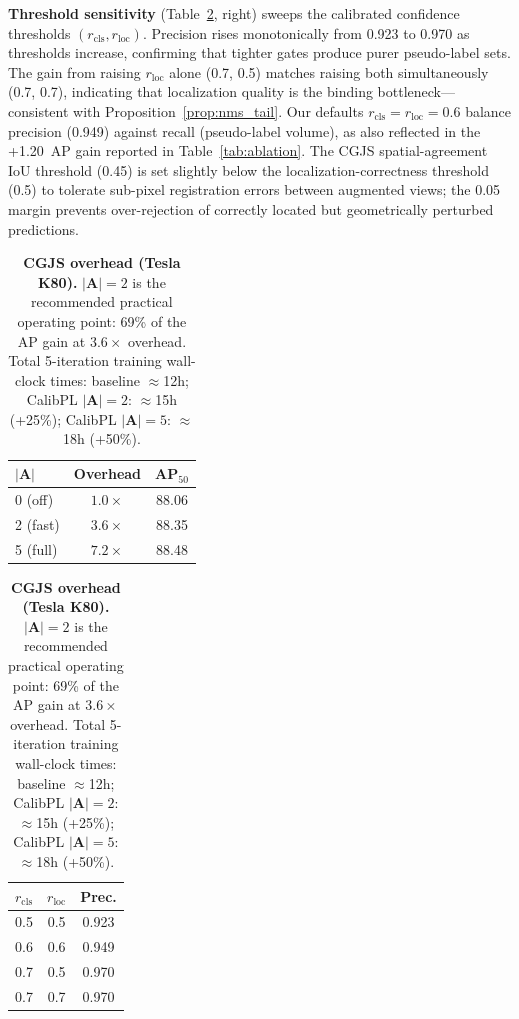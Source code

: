 \documentclass[10pt,twocolumn,letterpaper]{article}
\begin{document}
\textbf{Threshold sensitivity} (Table~\ref{tab:cgjs_overhead}, right)
sweeps the calibrated confidence thresholds $(r_\text{cls}, r_\text{loc})$.
Precision rises monotonically from 0.923 to 0.970 as thresholds increase,
confirming that tighter gates produce purer pseudo-label sets.
The gain from raising $r_\text{loc}$ alone (0.7, 0.5) matches raising both
simultaneously (0.7, 0.7), indicating that localization quality is the binding
bottleneck---consistent with Proposition~\ref{prop:nms_tail}.
Our defaults $r_\text{cls}{=}r_\text{loc}{=}0.6$ balance precision (0.949)
against recall (pseudo-label volume), as also reflected in the +1.20~AP gain
reported in Table~\ref{tab:ablation}.
The CGJS spatial-agreement IoU threshold (0.45) is set slightly below the
localization-correctness threshold (0.5) to tolerate sub-pixel registration
errors between augmented views; the 0.05 margin prevents over-rejection of
correctly located but geometrically perturbed predictions.

\begin{table}[t]
  \centering
  \caption{\textbf{CGJS overhead (Tesla K80).}
  $|\mathbf{A}|{=}2$ is the recommended practical operating point: 69\% of
  the AP gain at $3.6{\times}$ overhead. Total 5-iteration training wall-clock
  times: baseline $\approx$12h; CalibPL $|\mathbf{A}|{=}2$: $\approx$15h (+25\%);
  CalibPL $|\mathbf{A}|{=}5$: $\approx$18h (+50\%).}
  \vspace{2pt}
  \setlength{\tabcolsep}{3pt}
  \begin{minipage}[t]{0.48\columnwidth}
  \centering
  \begin{tabular}{lcc}
    \toprule
    $|\mathbf{A}|$ & Overhead & AP$_{50}$ \\
    \midrule
    0 (off)   & $1.0\times$ & 88.06 \\
    2 (fast)  & $3.6\times$ & 88.35 \\
    5 (full)  & $7.2\times$ & 88.48 \\
    \bottomrule
  \end{tabular}
  \end{minipage}%
  \hfill
  \begin{minipage}[t]{0.48\columnwidth}
  \centering
  \begin{tabular}{ccc}
    \toprule
    $r_\text{cls}$ & $r_\text{loc}$ & Prec. \\
    \midrule
    0.5 & 0.5 & 0.923 \\
    0.6 & 0.6 & 0.949 \\
    0.7 & 0.5 & 0.970 \\
    0.7 & 0.7 & 0.970 \\
    \bottomrule
  \end{tabular}
  \end{minipage}
  \label{tab:cgjs_overhead}
  \vspace{-4pt}
\end{table}
\end{document}
